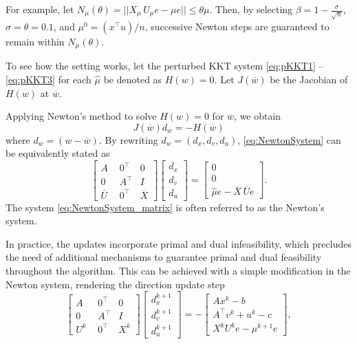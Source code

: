 For example, let $N_\mu(\theta) = ||X_\mu \, U_\mu e - \mu e|| \leq \theta\mu$. Then, by selecting $\beta = 1 -  \frac{\sigma}{\sqrt{n}}$, $\sigma = \theta = 0.1$, and $\mu^0= (x^\top u)/ n$, successive Newton steps are guaranteed to remain within $N_\mu(\theta)$. 

To see how the setting works, let the perturbed KKT system \eqref{eq:pKKT1} -- \eqref{eq:pKKT3} for each $\hat{\mu}$ be denoted as $H(w) = 0$. Let $J(\overline{w})$ be the Jacobian of $H(w)$ at $\overline{w}$. 

Applying Newton's method to solve $H(w)=0$ for $\overline{w}$, we obtain
\begin{equation}
J(\overline{w})d_w = -H(\overline{w}) \label{eq:NewtonSystem}
\end{equation}
where $d_w = (w - \overline{w})$. By rewriting $d_w = (d_x, d_v, d_u)$, \eqref{eq:NewtonSystem} can be equivalently stated as 
%
\begin{equation}
\begin{bmatrix} A ~\, & 0^{\top} & 0 \\ 0 ~\, & A^\top & I \\ \overline{U} ~\, & 0^{\top} & \overline{X} \end{bmatrix} \begin{bmatrix}d_x \\ d_v \\ d_u \end{bmatrix} =  
\begin{bmatrix}0 \\ 0 \\ \hat{\mu}e - \overline{X} \, \overline{U}e \end{bmatrix}. \label{eq:NewtonSystem_matrix}
\end{equation}
%
The system \eqref{eq:NewtonSystem_matrix} is often referred to as the Newton's system. 

In practice, the updates incorporate primal and dual infeasibility, which precludes the need of additional mechanisms to guarantee primal and dual feasibility throughout the algorithm. This can be achieved with a simple modification in the Newton system, rendering the direction update step
%
\begin{equation}
\begin{bmatrix} A ~\, & 0^{\top} & 0 \\ 
				0 ~\, & A^\top & I \\ 
				U^k ~\, & 0^{\top} & X^k 
\end{bmatrix} 
\begin{bmatrix}d_x^{k+1} \\ 
			   d_v^{k+1} \\ 
			   d_u^{k+1} 
\end{bmatrix} = - 
\begin{bmatrix} Ax^k - b \\ A^\top v^k + u^k - c \\ X^k U^ke -\mu^{k+1}e \end{bmatrix}, \label{eq:update_step}
\end{equation}
 

